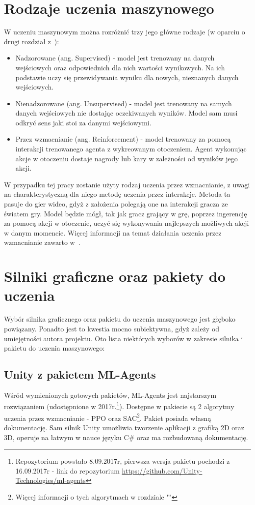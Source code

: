 \documentclass{SGGW-thesis}
\begin{document}
\section{Rodzaje uczenia maszynowego}
W uczeniu maszynowym można rozróżnić trzy jego główne rodzaje (w oparciu o drugi rozdział z~\cite{MachineLearningTypes}):
\begin{itemize}
  \item{Nadzorowane (ang. Supervised) - model jest trenowany na danych wejściowych oraz odpowiednich dla nich wartości wynikowych. Na ich podstawie uczy się przewidywania wyniku dla nowych, nieznanych danych wejściowych.}
  \item{Nienadzorowane (ang. Unsupervised) - model jest trenowany na samych danych wejściowych nie dostając oczekiwanych wyników. Model sam musi odkryć sens jaki stoi za danymi wejściowymi.}
  \item{Przez wzmacnianie (ang. Reinforcement) - model trenowany za pomocą interakcji trenowanego agenta z wykreowanym otoczeniem. Agent wykonując akcje w otoczeniu dostaje nagrody lub kary w zależności od wyników jego akcji.}
\end{itemize}
W przypadku tej pracy zostanie użyty rodzaj uczenia przez wzmacnianie, z uwagi na charakterystyczną dla niego metodę uczenia przez interakcje. 
Metoda ta pasuje do gier wideo, gdyż z założenia polegają one na interakcji gracza ze światem gry. Model będzie mógł, tak jak gracz grający w grę, 
poprzez ingerencję za pomocą akcji w otoczenie, uczyć się wykonywania najlepszych możliwych akcji w danym momencie. Więcej informacji na temat 
działania uczenia przez wzmacnianie zawarto w~\cite{ReinforcementLearning}.

\section{Silniki graficzne oraz pakiety do uczenia}
Wybór silnika graficznego oraz pakietu do uczenia maszynowego jest głęboko powiązany. Ponadto jest to kwestia mocno subiektywna, gdyż zależy od umiejętności autora projektu. Oto lista niektórych wyborów w zakresie silnika i pakietu do uczenia maszynowego:
\subsection{Unity z pakietem ML-Agents}
Wśród wymienionych gotowych pakietów, ML-Agents jest najstarszym rozwiązaniem (udostępnione w 2017r.\footnote{Repozytorium powstało 8.09.2017r, pierwsza wersja pakietu pochodzi z 16.09.2017r - link do repozytorium \url{https://github.com/Unity-Technologies/ml-agents}}).
Dostępne w pakiecie są 2 algorytmy uczenia przez wzmacnianie - PPO oraz SAC\footnote{Więcej informacji o tych algorytmach w rozdziale ""}. Pakiet posiada własną dokumentację\cite{MLAgentsDocs}. 
Sam silnik Unity umożliwia tworzenie aplikacji z grafiką 2D oraz 3D, operuje na łatwym w nauce języku C\# oraz ma rozbudowaną dokumentację\cite{UnityDocs}.
\end{document}
